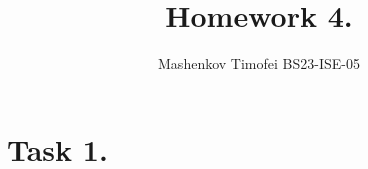 \documentclass{article}
\title{Homework 4.}
\author{Mashenkov Timofei BS23-ISE-05}
\affil{t.mashenkov@innopolis.university}
\begin{document}
\maketitle{}

\section*{Task 1.}

\addtolength{\jot}{1pt}
\begin{fleqn}[1\parindent]
  \begin{gather*}
  \end{gather*}
\end{fleqn}
\end{document}
